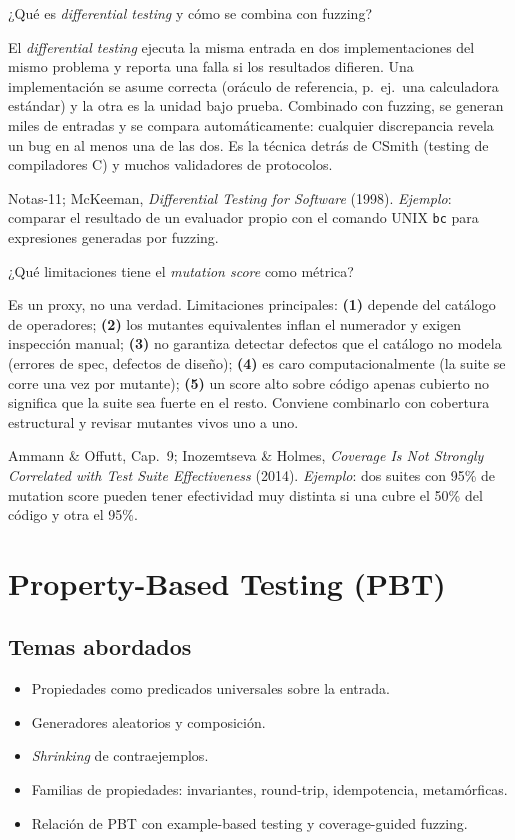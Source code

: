 \documentclass[11pt,a4paper]{article}
\newcounter{preg}
\newcommand{\qa}[3]{%
  \stepcounter{preg}%
  \vspace{0.4em}
  \begin{preguntabox}{\thepreg}
  #1
  \end{preguntabox}
  \begin{respuestabox}
  #2
  \end{respuestabox}
  \begin{refbox}
  #3
  \end{refbox}
  \vspace{0.6em}
}
\begin{document}
\qa{¿Qué es \emph{differential testing} y cómo se combina con fuzzing?}
{El \emph{differential testing} ejecuta la misma entrada en dos implementaciones del mismo problema y reporta una falla si los resultados difieren. Una implementación se asume correcta (oráculo de referencia, p.~ej.\ una calculadora estándar) y la otra es la unidad bajo prueba. Combinado con fuzzing, se generan miles de entradas y se compara automáticamente: cualquier discrepancia revela un bug en al menos una de las dos. Es la técnica detrás de CSmith (testing de compiladores C) y muchos validadores de protocolos.}
{Notas-11; McKeeman, \emph{Differential Testing for Software} (1998). \emph{Ejemplo}: comparar el resultado de un evaluador propio con el comando UNIX \texttt{bc} para expresiones generadas por fuzzing.}

\qa{¿Qué limitaciones tiene el \emph{mutation score} como métrica?}
{Es un proxy, no una verdad. Limitaciones principales: \textbf{(1)} depende del catálogo de operadores; \textbf{(2)} los mutantes equivalentes inflan el numerador y exigen inspección manual; \textbf{(3)} no garantiza detectar defectos que el catálogo no modela (errores de spec, defectos de diseño); \textbf{(4)} es caro computacionalmente (la suite se corre una vez por mutante); \textbf{(5)} un score alto sobre código apenas cubierto no significa que la suite sea fuerte en el resto. Conviene combinarlo con cobertura estructural y revisar mutantes vivos uno a uno.}
{Ammann \& Offutt, Cap.~9; Inozemtseva \& Holmes, \emph{Coverage Is Not Strongly Correlated with Test Suite Effectiveness} (2014). \emph{Ejemplo}: dos suites con 95\% de mutation score pueden tener efectividad muy distinta si una cubre el 50\% del código y otra el 95\%.}

\section{Property-Based Testing (PBT)}

\subsection*{Temas abordados}
\begin{itemize}[leftmargin=1.4em]
  \item Propiedades como predicados universales sobre la entrada.
  \item Generadores aleatorios y composición.
  \item \emph{Shrinking} de contraejemplos.
  \item Familias de propiedades: invariantes, round-trip, idempotencia, metamórficas.
  \item Relación de PBT con example-based testing y coverage-guided fuzzing.
\end{itemize}
\end{document}
